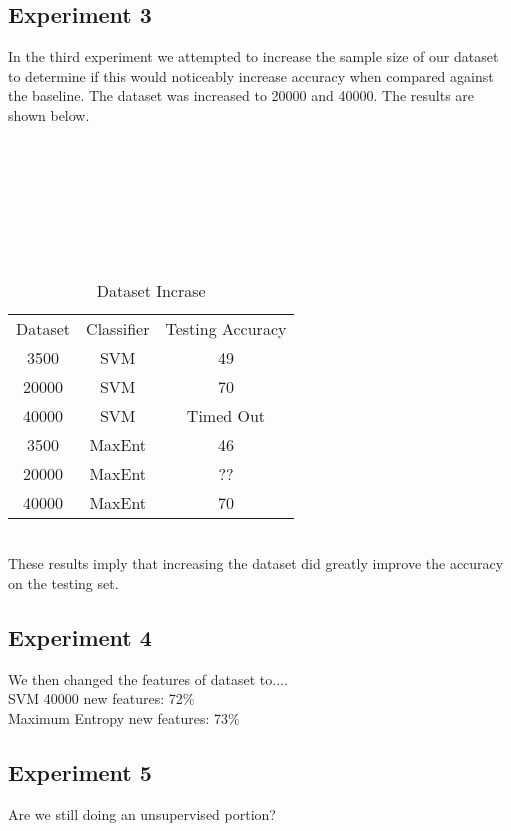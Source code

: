 \subsection{Experiment 3}
In the third experiment we attempted to increase the sample size of our dataset to determine if this would noticeably increase accuracy when
compared against the baseline.  The dataset was increased to 20000 and 40000.  The results are shown below.
\\
\\
\\
\\
\\
\\
\\
\\
\begin{table}[h]
\caption{Dataset Incrase}
\centering
\begin{tabular}{c c c}
Dataset & Classifier & Testing Accuracy \\
3500 & SVM & 49 \\
20000 & SVM & 70 \\
40000 & SVM & Timed Out \\
3500 & MaxEnt & 46 \\
20000 & MaxEnt & ?? \\
40000 & MaxEnt & 70 \\
\end{tabular}
\end{table}
\\
These results imply that increasing the dataset did greatly improve the accuracy on the testing set.

\subsection{Experiment 4}
We then changed the features of dataset to....
\\SVM 40000 new features: 72\%
\\Maximum Entropy new features: 73\% 


\subsection{Experiment 5}
Are we still doing an unsupervised portion?
